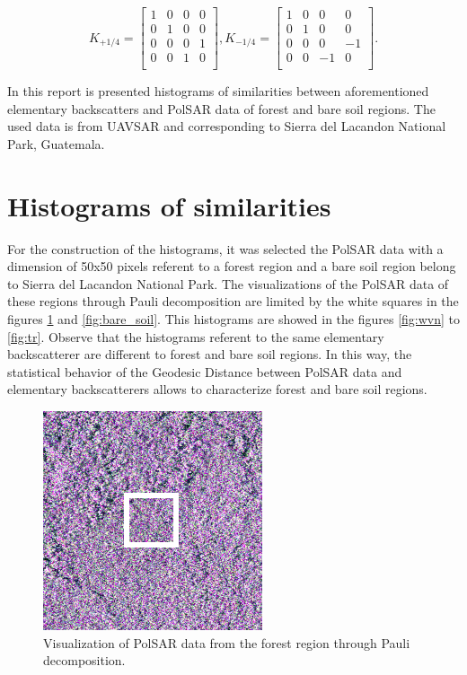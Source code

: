 \documentclass[conference]{IEEEtran}
\begin{document}
\[K_{+1/4}=
\begin{bmatrix}
1 & 0 & 0 & 0\\
0 & 1 & 0 & 0\\
0 & 0 & 0 & 1\\
0 & 0 & 1 & 0\\
\end{bmatrix},
K_{-1/4}=
\begin{bmatrix}
1 & 0 & 0 & 0\\
0 & 1 & 0 & 0\\
0 & 0 & 0 & -1\\
0 & 0 & -1 & 0\\
\end{bmatrix}
.\]

In this report is presented histograms of similarities between aforementioned elementary backscatters and PolSAR data of forest and bare soil regions. 
The used data is from UAVSAR and corresponding to Sierra  del  Lacandon  National  Park,  Guatemala. 

\section{Histograms of similarities}

For the construction of the histograms, it was selected the PolSAR data with a dimension of 50x50 pixels referent to a forest region and a bare soil region belong to Sierra  del Lacandon National Park. The visualizations of the PolSAR data of these regions through Pauli decomposition are limited by the white squares in the figures \ref{fig:forest} and \ref{fig:bare_soil}. This histograms are showed in the figures \ref{fig:wvn} to \ref{fig:tr}. Observe that the histograms referent to the same elementary backscatterer are different to forest and bare soil regions. In this way, the statistical behavior of the Geodesic Distance between PolSAR data and elementary backscatterers allows to characterize forest and bare soil regions.

\begin{figure}[!ht]
    \vspace{.1\linewidth}
    \centering
    \includegraphics[width = .7\linewidth, height = .7\linewidth]{../../../Images/paper_19_05/forest.png}
    \caption{Visualization of PolSAR data from the forest region through Pauli decomposition.}
    \label{fig:forest}
\end{figure}
\end{document}
